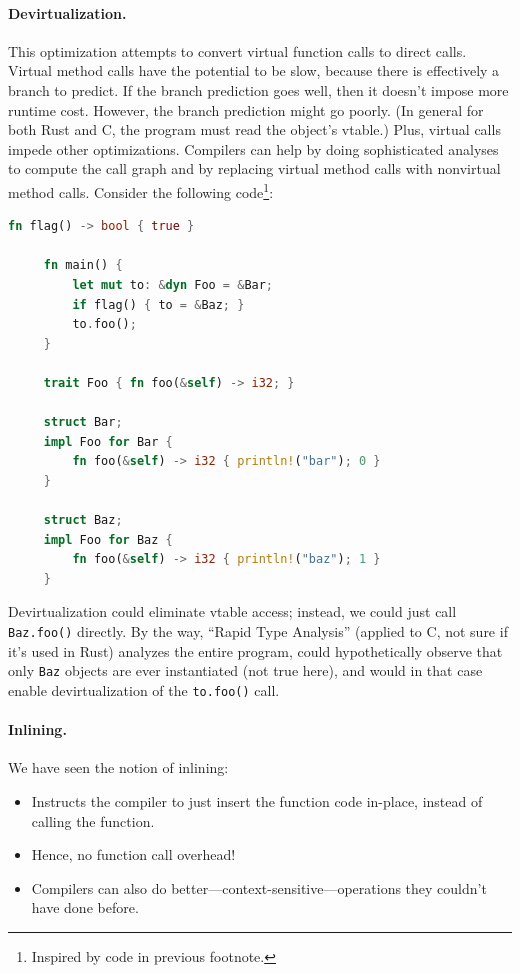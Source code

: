 \documentclass[a4paper]{report}
\newcommand{\CPP}{C\nolinebreak\hspace{-.05em}\raisebox{.4ex}{\tiny\bf +}\nolinebreak\hspace{-.10em}\raisebox{.4ex}{\tiny\bf +}}
\def\CPP{{C\nolinebreak[4]\hspace{-.05em}\raisebox{.4ex}{\tiny\bf ++}}}
\begin{document}
\paragraph{Devirtualization.} This optimization attempts to convert
virtual function calls to direct calls.  Virtual method calls have the
potential to be slow, because there is effectively a branch to
predict. If the branch prediction goes well, then it doesn't impose
more runtime cost. However, the branch prediction might go poorly.  (In
general for both Rust and \CPP, the program must read the object's vtable.) Plus, virtual
calls impede other optimizations. Compilers can help by doing
sophisticated analyses to compute the call graph and by replacing
virtual method calls with nonvirtual method calls.  Consider the
following code\footnote{Inspired by code in previous footnote.}:
  \begin{lstlisting}[language=Rust]
     fn flag() -> bool { true }

     fn main() {
         let mut to: &dyn Foo = &Bar;
         if flag() { to = &Baz; }
         to.foo();
     }

     trait Foo { fn foo(&self) -> i32; }

     struct Bar;
     impl Foo for Bar {
         fn foo(&self) -> i32 { println!("bar"); 0 }
     }

     struct Baz;
     impl Foo for Baz {
         fn foo(&self) -> i32 { println!("baz"); 1 }
     }
  \end{lstlisting}
Devirtualization could eliminate vtable access; instead, we could just call {\tt Baz.foo()} 
directly. By the way, ``Rapid Type Analysis'' (applied to \CPP, not sure if it's used in Rust)
analyzes the entire program, could hypothetically observe that
only {\tt Baz} objects are ever instantiated (not true here), and would in that case
enable devirtualization
of the {\tt to.foo()} call.

\paragraph{Inlining.} We have seen the notion of inlining:
  \begin{itemize}[noitemsep]
    \item Instructs the compiler to just insert the function code in-place,
      instead of calling the function.
    \item Hence, no function call overhead!
    \item Compilers can also do better---context-sensitive---operations they couldn't
      have done before.
  \end{itemize}
\end{document}
